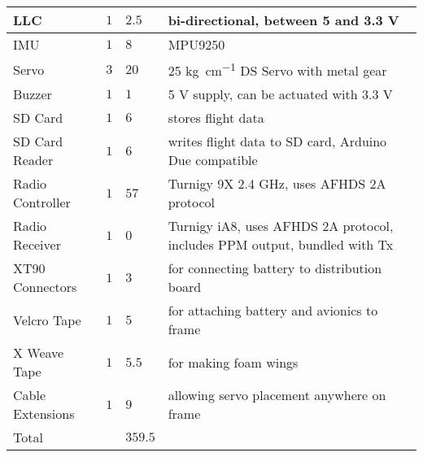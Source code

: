 \begin{table}[htpb!]
\begin{tabular}{p{3.5cm}|p{1.5cm}|p{1.5cm}|p{7.5cm}}
        \hline
        LLC & $1$ & $2.5$ & bi-directional, between 5 and 3.3 \si{\volt}\\
        \hline
        IMU & $1$ & $8$ & MPU9250\\
        \hline
        Servo & $3$ & $20$ & 25 \si{\kilogram\per\centi\meter} DS Servo with metal gear\\
        \hline
        Buzzer & $1$ & $1$ & 5 \si{\volt} supply, can be actuated with 3.3 \si{\volt}\\
        \hline
        SD Card & $1$ & $6$ & stores flight data\\
        \hline
        SD Card Reader & $1$ & $6$ & writes flight data to SD card, Arduino Due compatible\\
        \hline
        Radio Controller & $1$ & $57$ & Turnigy 9X 2.4 GHz, uses AFHDS 2A protocol\\
        \hline
        Radio Receiver & $1$ & $0$ & Turnigy iA8, uses AFHDS 2A protocol, includes PPM output, bundled with Tx\\
        \hline
        XT90 Connectors & $1$ & $3$ & for connecting battery to distribution board\\
        \hline
        Velcro Tape & $1$ & $5$ & for attaching battery and avionics to frame\\
        \hline
        X Weave Tape & $1$ & $5.5$ & for making foam wings\\
        \hline
        Cable Extensions & $1$ & $9$ & allowing servo placement anywhere on frame\\
        \hline
        Total & & $359.5$ & \\
        \hline
    \end{tabular}
    \label{tab:parts_list}
\end{table}
